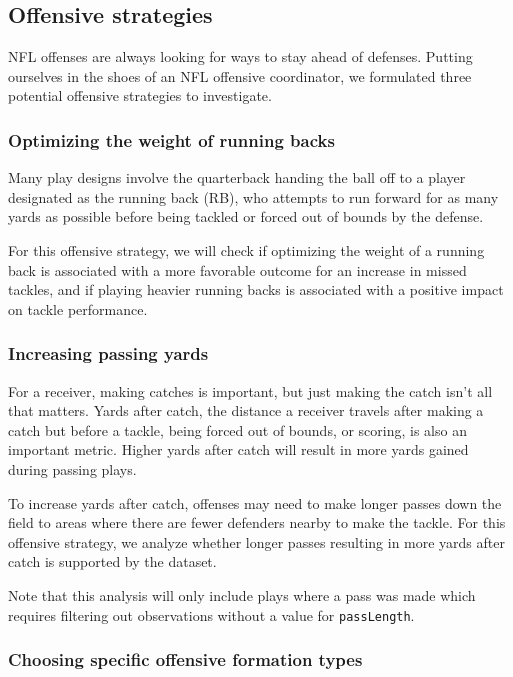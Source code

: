 \documentclass[bibtex, sigconf, hyperref={colorlinks=true,linkcolor=blue,urlcolor=blue}]{acmart}
\begin{document}
\subsection{Offensive strategies}

NFL offenses are always looking for ways to stay ahead of defenses. Putting
ourselves in the shoes of an NFL offensive coordinator, we formulated three
potential offensive strategies to investigate.

\subsubsection{Optimizing the weight of running backs}

Many play designs involve the quarterback handing the ball off to a player
designated as the running back (RB), who attempts to run forward for as many
yards as possible before being tackled or forced out of bounds by the defense.

For this offensive strategy, we will check if optimizing the weight of a running
back is associated with a more favorable outcome for an increase in missed
tackles, and if playing heavier running backs is associated with a positive
impact on tackle performance.

\subsubsection{Increasing passing yards}

For a receiver, making catches is important, but just making the catch isn't all
that matters. Yards after catch, the distance a receiver travels after making a
catch but before a tackle, being forced out of bounds, or scoring, is also an
important metric. Higher yards after catch will result in more yards gained
during passing plays.

To increase yards after catch, offenses may need to make longer passes down the
field to areas where there are fewer defenders nearby to make the tackle. For
this offensive strategy, we analyze whether longer passes resulting in more yards
after catch is supported by the dataset.

Note that this analysis will only include plays where a pass was made which
requires filtering out observations without a value for \texttt{passLength}.

\subsubsection{Choosing specific offensive formation types}
\end{document}
